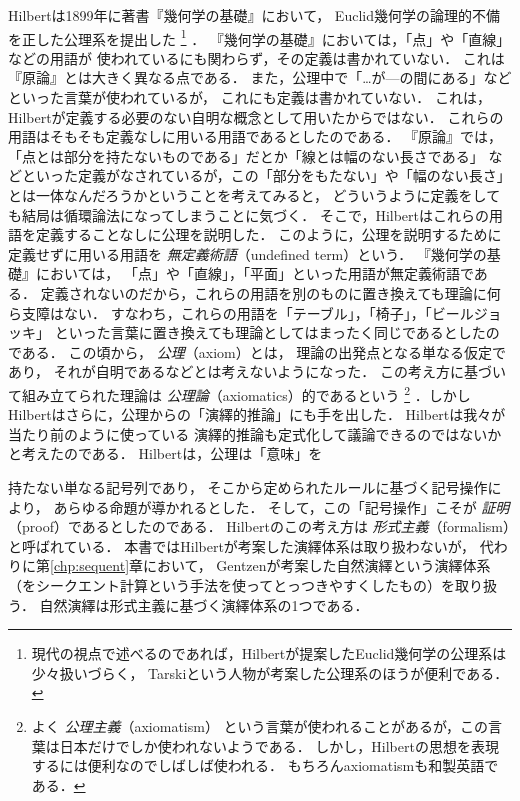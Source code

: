   Hilbertは1899年に著書『幾何学の基礎』において，
  Euclid幾何学の論理的不備を正した公理系を提出した
  \footnote{現代の視点で述べるのであれば，Hilbertが提案したEuclid幾何学の公理系は
  少々扱いづらく，
Tarskiという人物が考案した公理系のほうが便利である．}
  ．
  『幾何学の基礎』においては，「点」や「直線」などの用語が
  使われているにも関わらず，その定義は書かれていない．
  これは『原論』とは大きく異なる点である．
  また，公理中で「…が---の間にある」などといった言葉が使われているが，
  これにも定義は書かれていない．
  これは，Hilbertが定義する必要のない自明な概念として用いたからではない．
  これらの用語はそもそも定義なしに用いる用語であるとしたのである．
  『原論』では，「点とは部分を持たないものである」だとか「線とは幅のない長さである」
  などといった定義がなされているが，この「部分をもたない」や「幅のない長さ」
  とは一体なんだろうかということを考えてみると，
  どういうように定義をしても結局は循環論法になってしまうことに気づく．
  そこで，Hilbertはこれらの用語を定義することなしに公理を説明した．
  このように，公理を説明するために定義せずに用いる用語を
  \emph{無定義術語}（undefined term）という．
  『幾何学の基礎』においては，
  「点」や「直線」，「平面」といった用語が無定義術語である．
  定義されないのだから，これらの用語を別のものに置き換えても理論に何ら支障はない．
  すなわち，これらの用語を「テーブル」，「椅子」，「ビールジョッキ」
  といった言葉に置き換えても理論としてはまったく同じであるとしたのである．
  この頃から，
  \emph{公理}（axiom）とは，
  理論の出発点となる単なる仮定であり，
  それが自明であるなどとは考えないようになった．
  この考え方に基づいて組み立てられた理論は
  \emph{公理論}（axiomatics）的であるという
  \footnote{よく
    \emph{公理主義}（axiomatism）
    という言葉が使われることがあるが，この言葉は日本だけでしか使われないようである．
    しかし，Hilbertの思想を表現するには便利なのでしばしば使われる．
    もちろんaxiomatismも和製英語である．}
  ．しかしHilbertはさらに，公理からの「演繹的推論」にも手を出した．
  Hilbertは我々が当たり前のように使っている
  演繹的推論も定式化して議論できるのではないかと考えたのである．
  Hilbertは，公理は「意味」を
  
  持たない単なる記号列であり，
  そこから定められたルールに基づく記号操作により，
  あらゆる命題が導かれるとした．
  そして，この「記号操作」こそが
  \emph{証明}（proof）であるとしたのである．
  Hilbertのこの考え方は
  \emph{形式主義}（formalism）と呼ばれている．
  本書ではHilbertが考案した演繹体系は取り扱わないが，
  代わりに第\ref{chp:sequent}章において，
  Gentzenが考案した自然演繹という演繹体系
  （をシークエント計算という手法を使ってとっつきやすくしたもの）を取り扱う．
  自然演繹は形式主義に基づく演繹体系の1つである．

